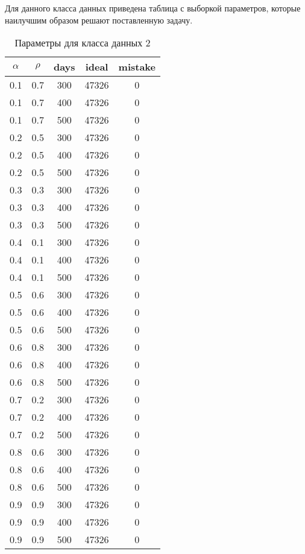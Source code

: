 Для данного класса данных приведена таблица с выборкой параметров, которые наилучшим образом решают поставленную задачу.

\begin{center}
    \captionsetup{justification=raggedright,singlelinecheck=off}
    \begin{longtable}[c]{|c|c|c|c|c|}
    \caption{Параметры для класса данных 2\label{tbl:table_kd2}}\\ \hline
        $\alpha$ & $\rho$ & days & ideal & mistake \\ \hline
    
 0.1 &  0.7 &  300 & 47326 &     0 \\
 0.1 &  0.7 &  400 & 47326 &     0 \\
 0.1 &  0.7 &  500 & 47326 &     0 \\
 \hline
 0.2 &  0.5 &  300 & 47326 &     0 \\
 0.2 &  0.5 &  400 & 47326 &     0 \\
 0.2 &  0.5 &  500 & 47326 &     0 \\
 \hline
 0.3 &  0.3 &  300 & 47326 &     0 \\
 0.3 &  0.3 &  400 & 47326 &     0 \\
 0.3 &  0.3 &  500 & 47326 &     0 \\
\hline
 0.4 &  0.1 &  300 & 47326 &     0 \\
 0.4 &  0.1 &  400 & 47326 &     0 \\
 0.4 &  0.1 &  500 & 47326 &     0 \\
\hline
 0.5 &  0.6 &  300 & 47326 &     0 \\
 0.5 &  0.6 &  400 & 47326 &     0 \\
 0.5 &  0.6 &  500 & 47326 &     0 \\
 \hline
 0.6 &  0.8 &  300 & 47326 &     0 \\
 0.6 &  0.8 &  400 & 47326 &     0 \\
 0.6 &  0.8 &  500 & 47326 &     0 \\
\hline
 0.7 &  0.2 &  300 & 47326 &     0 \\
 0.7 &  0.2 &  400 & 47326 &     0 \\
 0.7 &  0.2 &  500 & 47326 &     0 \\
\hline
 0.8 &  0.6 &  300 & 47326 &     0 \\
 0.8 &  0.6 &  400 & 47326 &     0 \\
 0.8 &  0.6 &  500 & 47326 &     0 \\
\hline
 0.9 &  0.9 &  300 & 47326 &     0 \\
 0.9 &  0.9 &  400 & 47326 &     0 \\
 0.9 &  0.9 &  500 & 47326 &     0 \\
\hline
\end{longtable}
\end{center}

